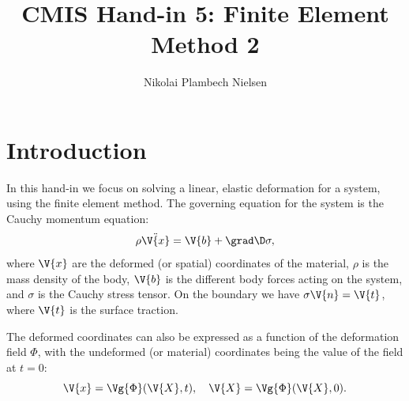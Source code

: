 \documentclass[sigconf]{acmart}
\begin{document}
%
\title{CMIS Hand-in 5: Finite Element Method 2}

\author{Nikolai Plambech Nielsen}


\maketitle

\section{Introduction}
In this hand-in we focus on solving a linear, elastic deformation for a system, using the finite element method. The governing equation for the system is the Cauchy momentum equation:
\begin{equation}
	\rho \ddot{\V{x}} = \V{b} + \grad \D \sigma,
\end{equation}
where $ \V{x} $ are the deformed (or spatial) coordinates of the material, $ \rho $ is the mass density of the body, $ \V{b} $ is the different body forces acting on the system, and $ \sigma $ is the Cauchy stress tensor. On the boundary we have $ \sigma \V{n} = \V{t} $, where $ \V{t} $ is the surface traction.

The deformed coordinates can also be expressed as a function of the deformation field $ \Phi $, with the undeformed (or material) coordinates being the value of the field at $ t=0 $:
\begin{equation}
	\V{x} = \Vg{\Phi}(\V{X}, t), \quad \V{X} = \Vg{\Phi}(\V{X}, 0).
\end{equation}
\end{document}
